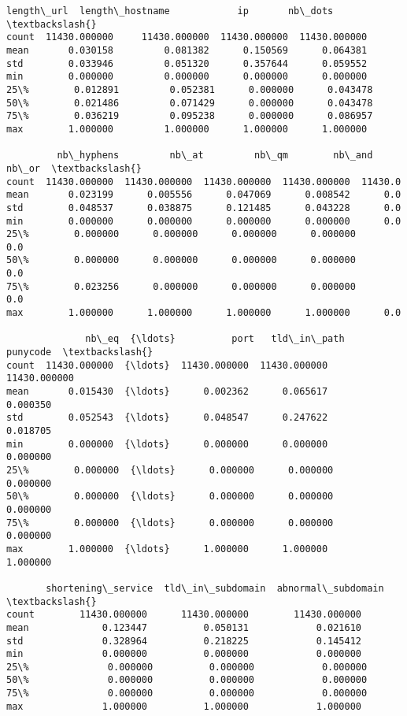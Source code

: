             \begin{tcolorbox}[breakable, size=fbox, boxrule=.5pt, pad at break*=1mm, opacityfill=0]
\begin{Verbatim}[commandchars=\\\{\}]
         length\_url  length\_hostname            ip       nb\_dots  \textbackslash{}
count  11430.000000     11430.000000  11430.000000  11430.000000
mean       0.030158         0.081382      0.150569      0.064381
std        0.033946         0.051320      0.357644      0.059552
min        0.000000         0.000000      0.000000      0.000000
25\%        0.012891         0.052381      0.000000      0.043478
50\%        0.021486         0.071429      0.000000      0.043478
75\%        0.036219         0.095238      0.000000      0.086957
max        1.000000         1.000000      1.000000      1.000000

         nb\_hyphens         nb\_at         nb\_qm        nb\_and    nb\_or  \textbackslash{}
count  11430.000000  11430.000000  11430.000000  11430.000000  11430.0
mean       0.023199      0.005556      0.047069      0.008542      0.0
std        0.048537      0.038875      0.121485      0.043228      0.0
min        0.000000      0.000000      0.000000      0.000000      0.0
25\%        0.000000      0.000000      0.000000      0.000000      0.0
50\%        0.000000      0.000000      0.000000      0.000000      0.0
75\%        0.023256      0.000000      0.000000      0.000000      0.0
max        1.000000      1.000000      1.000000      1.000000      0.0

              nb\_eq  {\ldots}          port   tld\_in\_path      punycode  \textbackslash{}
count  11430.000000  {\ldots}  11430.000000  11430.000000  11430.000000
mean       0.015430  {\ldots}      0.002362      0.065617      0.000350
std        0.052543  {\ldots}      0.048547      0.247622      0.018705
min        0.000000  {\ldots}      0.000000      0.000000      0.000000
25\%        0.000000  {\ldots}      0.000000      0.000000      0.000000
50\%        0.000000  {\ldots}      0.000000      0.000000      0.000000
75\%        0.000000  {\ldots}      0.000000      0.000000      0.000000
max        1.000000  {\ldots}      1.000000      1.000000      1.000000

       shortening\_service  tld\_in\_subdomain  abnormal\_subdomain  \textbackslash{}
count        11430.000000      11430.000000        11430.000000
mean             0.123447          0.050131            0.021610
std              0.328964          0.218225            0.145412
min              0.000000          0.000000            0.000000
25\%              0.000000          0.000000            0.000000
50\%              0.000000          0.000000            0.000000
75\%              0.000000          0.000000            0.000000
max              1.000000          1.000000            1.000000


\end{Verbatim}
\end{tcolorbox}

